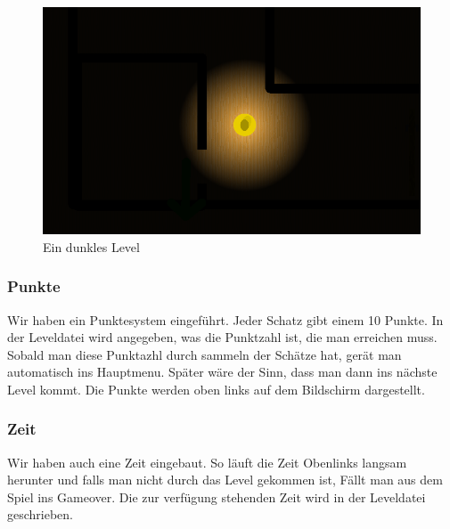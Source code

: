 \documentclass[12pt,a4paper]{scrartcl}
\begin{document}
\begin{figure}[h] 	
\centering 	
\includegraphics[scale=0.5]{img/dunkel.png} 	
\caption{Ein dunkles Level} 	
\end{figure} 	
 	
\subsubsection{Punkte} 	
Wir haben ein Punktesystem eingeführt. Jeder Schatz gibt einem 10 Punkte. In der Leveldatei wird angegeben, was die Punktzahl ist, die man erreichen muss. Sobald man diese Punktazhl durch sammeln der Schätze hat, gerät man automatisch ins Hauptmenu. Später wäre der Sinn, dass man dann ins nächste Level kommt. Die Punkte werden oben links auf dem Bildschirm dargestellt. 	
 	
\subsubsection{Zeit} 	
Wir haben auch eine Zeit eingebaut. So läuft die Zeit Obenlinks langsam herunter und falls man nicht durch das Level gekommen ist, Fällt man aus dem Spiel ins Gameover. Die zur verfügung stehenden Zeit wird in der Leveldatei geschrieben.	
 	
\end{document}
